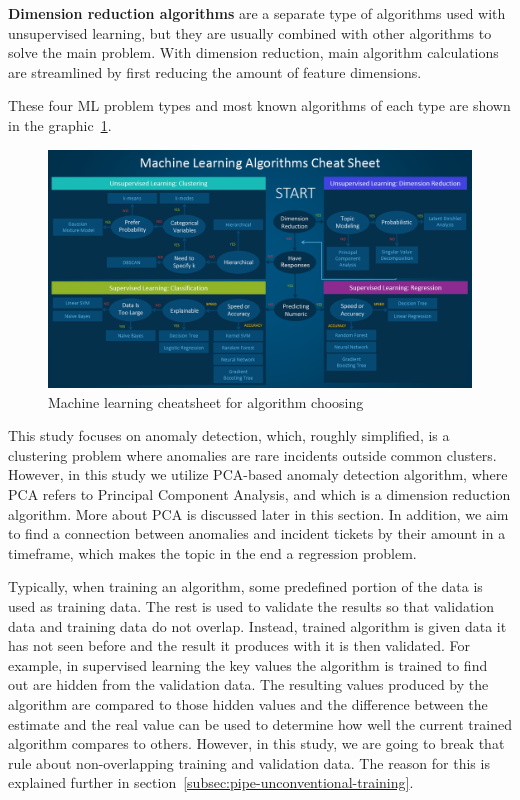 \textbf{Dimension reduction algorithms} are a separate type of algorithms used with unsupervised learning,
but they are usually combined with other algorithms
to solve the main problem.
With dimension reduction,
main algorithm calculations are streamlined by first reducing the amount of feature dimensions.\cite{li2017mlalgorithm}

These four ML problem types
and most known algorithms of each type
are shown in the graphic~\ref{fig:ml-algorithm-cheatsheet}.


\begin{figure}[htb]
    \centering
    \includegraphics[width=150mm]{./appendices/machine-learning-cheet-sheet-2}
    \caption{Machine learning cheatsheet for algorithm choosing\cite{li2017mlalgorithm}
    \label{fig:ml-algorithm-cheatsheet}}
\end{figure}

This study focuses on anomaly detection,
which, roughly simplified, is a clustering problem
where anomalies are rare incidents outside common clusters.
However,
in this study we utilize PCA-based anomaly detection algorithm,
where PCA refers to Principal Component Analysis,
and which is a dimension reduction algorithm.\cite{li2017mlalgorithm}
More about PCA
is discussed later in this section.
In addition,
we aim to find a connection between anomalies and incident tickets
by their amount in a timeframe,
which makes the topic in the end a regression problem.

Typically,
when training an algorithm,
some predefined portion of the data
is used as training data.
The rest is used to validate the results
so that validation data and training data do not overlap.
Instead, trained algorithm is given data it has not seen before
and the result it produces with it is then validated.\cite{baheti2022datasplit}
For example,
in supervised learning
the key values the algorithm is trained to find out
are hidden from the validation data.
The resulting values produced by the algorithm
are compared to those hidden values
and the difference between the estimate and the real value
can be used to determine how well the current trained algorithm compares to others.
However, in this study,
we are going to break that rule
about non-overlapping training and validation data.
The reason for this is explained further in section~\ref{subsec:pipe-unconventional-training}.

